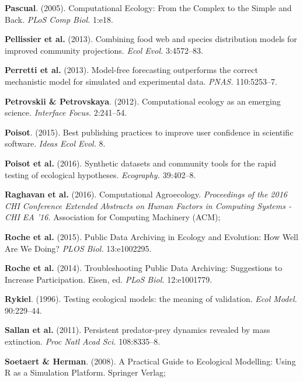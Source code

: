 \documentclass[12pt]{article}
\begin{document}
\leavevmode\hypertarget{ref-Pasc05}{}%
\textbf{Pascual}. (2005). Computational Ecology: From the Complex to the
Simple and Back. \emph{PLoS Comp Biol.} 1:e18.

\leavevmode\hypertarget{ref-PellRohr13}{}%
\textbf{Pellissier et al.} (2013). Combining food web and species
distribution models for improved community projections. \emph{Ecol
Evol.} 3:4572--83.

\leavevmode\hypertarget{ref-PerrMunc13}{}%
\textbf{Perretti et al.} (2013). Model-free forecasting outperforms the
correct mechanistic model for simulated and experimental data.
\emph{PNAS.} 110:5253--7.

\leavevmode\hypertarget{ref-PetrPetr12}{}%
\textbf{Petrovskii \& Petrovskaya}. (2012). Computational ecology as an
emerging science. \emph{Interface Focus.} 2:241--54.

\leavevmode\hypertarget{ref-Pois15}{}%
\textbf{Poisot}. (2015). Best publishing practices to improve user
confidence in scientific software. \emph{Ideas Ecol Evol.} 8.

\leavevmode\hypertarget{ref-PoisGrav16}{}%
\textbf{Poisot et al.} (2016). Synthetic datasets and community tools
for the rapid testing of ecological hypotheses. \emph{Ecography.}
39:402--8.

\leavevmode\hypertarget{ref-RaghNard16}{}%
\textbf{Raghavan et al.} (2016). Computational Agroecology.
\emph{Proceedings of the 2016 CHI Conference Extended Abstracts on Human
Factors in Computing Systems - CHI EA '16.} Association for Computing
Machinery (ACM);

\leavevmode\hypertarget{ref-RochKruu15}{}%
\textbf{Roche et al.} (2015). Public Data Archiving in Ecology and
Evolution: How Well Are We Doing? \emph{PLOS Biol.} 13:e1002295.

\leavevmode\hypertarget{ref-RochLanf14}{}%
\textbf{Roche et al.} (2014). Troubleshooting Public Data Archiving:
Suggestions to Increase Participation. Eisen, ed. \emph{PLoS Biol.}
12:e1001779.

\leavevmode\hypertarget{ref-Ryki96}{}%
\textbf{Rykiel}. (1996). Testing ecological models: the meaning of
validation. \emph{Ecol Model.} 90:229--44.

\leavevmode\hypertarget{ref-SallKamm11}{}%
\textbf{Sallan et al.} (2011). Persistent predator-prey dynamics
revealed by mass extinction. \emph{Proc Natl Acad Sci.} 108:8335--8.

\leavevmode\hypertarget{ref-SoetHerm08}{}%
\textbf{Soetaert \& Herman}. (2008). A Practical Guide to Ecological
Modelling: Using R as a Simulation Platform. Springer Verlag;
\end{document}
